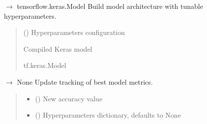 \documentclass[letterpaper,10pt,english]{sphinxmanual}
\begin{document}
\begin{fulllineitems}
\label{\detokenize{autoapi/src/RNNTrainer/index:src.RNNTrainer.__build_model}}
\pysigstartsignatures
\pysiglinewithargsret
{}
{}
{{ $\rightarrow$ tensorflow.keras.Model}}
\pysigstopsignatures
\sphinxAtStartPar
Build model architecture with tunable hyperparameters.
\begin{quote}\begin{description}
\sphinxAtStartPar
{} () \textendash{} Hyperparameters configuration

\sphinxAtStartPar
Compiled Keras model

\sphinxAtStartPar
tf.keras.Model

\end{description}\end{quote}

\end{fulllineitems}


\begin{fulllineitems}
\label{\detokenize{autoapi/src/RNNTrainer/index:src.RNNTrainer.__update_best_args}}
\pysigstartsignatures
\pysiglinewithargsret
{}
{\sphinxparamcomma {}}
{{ $\rightarrow$ None}}
\pysigstopsignatures
\sphinxAtStartPar
Update tracking of best model metrics.
\begin{quote}\begin{description}
\begin{itemize}
\item {} 
\sphinxAtStartPar
{} () \textendash{} New accuracy value

\item {} 
\sphinxAtStartPar
{} (\sphinxstyleliteralemphasis{\sphinxupquote{, }}) \textendash{} Hyperparameters dictionary, defaults to None

\end{itemize}

\end{description}\end{quote}

\end{fulllineitems}
\end{document}

